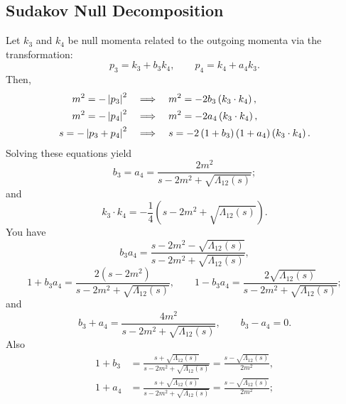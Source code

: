 \subsection{Sudakov Null Decomposition}
Let $k_{3}$ and $k_{4}$ be null momenta related to the outgoing momenta via the transformation:
\begin{equation}
	p_{3} = k_{3} + b_{3} k_{4}, \qquad p_{4} = k_{4} + a_{4} k_{3}.
	\label{eq:sudakov_3_4}
\end{equation}
Then,
\begin{align}
	m^{2} = - \left\lvert p_{3} \right\rvert^{2} \quad &\Longrightarrow \quad m^{2} = - 2 b_{3} \left( k_{3} \cdot k_{4} \right), \\
	m^{2} = - \left\lvert p_{4} \right\rvert^{2} \quad &\Longrightarrow \quad m^{2} = - 2 a_{4} \left( k_{3} \cdot k_{4} \right), \\
	s = - \left\lvert p_{3} + p_{4} \right\rvert^{2} \quad &\Longrightarrow \quad s = - 2 \left(1 + b_{3} \right) \left(1 + a_{4} \right) \left( k_{3} \cdot k_{4} \right).
\end{align}
Solving these equations yield
\begin{equation}
	b_{3} = a_{4} = \frac{2 m^{2}}{s - 2m^{2} + \sqrt{\Lambda_{12}(s)}};
\end{equation}
and
\begin{equation}
	k_{3} \cdot k_{4} = -\frac{1}{4} \left( s - 2m^{2} + \sqrt{\Lambda_{12}(s)} \right).
\end{equation}
You have
\begin{equation}
	b_{3} a_{4} = \frac{s - 2m^{2} - \sqrt{\Lambda_{12}(s)}}{s - 2m^{2} + \sqrt{\Lambda_{12}(s)}},
\end{equation}
\begin{equation}
	1 + b_{3} a_{4} = \frac{ 2 \left( s - 2m^{2} \right)}{s - 2m^{2} + \sqrt{\Lambda_{12}(s)}}, \qquad
	1 - b_{3} a_{4} = \frac{ 2 \sqrt{\Lambda_{12}(s)}}{s - 2m^{2} + \sqrt{\Lambda_{12}(s)}};
\end{equation}
and
\begin{equation}
	b_{3} + a_{4} = \frac{ 4m^{2} }{s - 2m^{2} + \sqrt{\Lambda_{12}(s)}}, \qquad
	b_{3} - a_{4} = 0.
\end{equation}
Also
\begin{align}
	1 + b_{3} &= \frac{s + \sqrt{\Lambda_{12}(s)}}{s - 2m^{2} + \sqrt{\Lambda_{12}(s)}} = \frac{s - \sqrt{\Lambda_{12}(s)}}{2m^{2}}, \\
	1 + a_{4} &= \frac{s + \sqrt{\Lambda_{12}(s)}}{s - 2m^{2} + \sqrt{\Lambda_{12}(s)}} = \frac{s - \sqrt{\Lambda_{12}(s)}}{2m^{2}};
\end{align}
